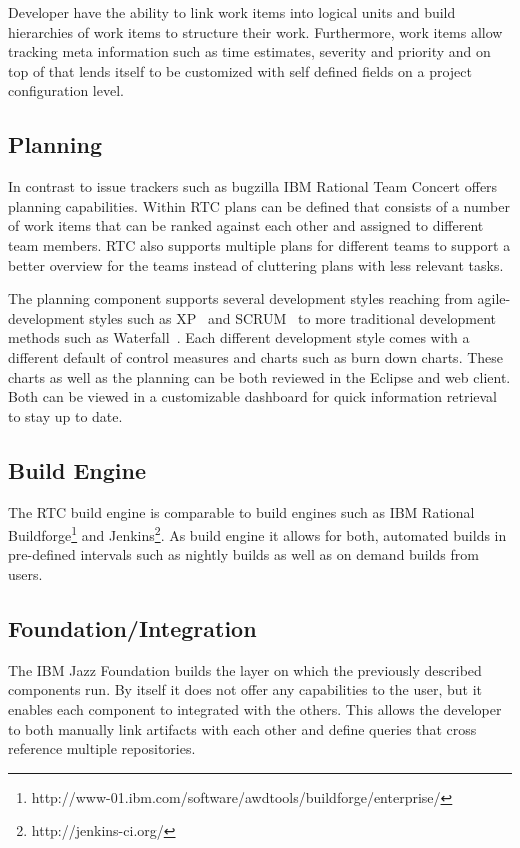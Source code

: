 Developer have the ability to link work items into logical units and build hierarchies of work items to structure their work.
Furthermore, work items allow tracking meta information such as time estimates, severity and priority and on top of that lends itself to be customized with self defined fields on a project configuration level.


\subsection{Planning}
In contrast to issue trackers such as bugzilla IBM Rational Team Concert offers planning capabilities.
Within RTC plans can be defined that consists of a number of work items that can be ranked against each other and assigned to different team members.
RTC also supports multiple plans for different teams to support a better overview for the teams instead of cluttering plans with less relevant tasks.

The planning component supports several development styles reaching from agile-development styles such as XP~\cite{} and SCRUM~\cite{} to more traditional development methods such as Waterfall~\cite{}.
Each different development style comes with a different default of control measures and charts such as burn down charts.
These charts as well as the planning can be both reviewed in the Eclipse and web client.
Both can be viewed in a customizable dashboard for quick information retrieval to stay up to date.

\subsection{Build Engine}
The RTC build engine is comparable to build engines such as IBM Rational Buildforge\footnote{http://www-01.ibm.com/software/awdtools/buildforge/enterprise/} and Jenkins\footnote{http://jenkins-ci.org/}.
As build engine it allows for both, automated builds in pre-defined intervals such as nightly builds as well as on demand builds from users.

\subsection{Foundation/Integration}
The IBM Jazz Foundation builds the layer on which the previously described components run.
By itself it does not offer any capabilities to the user, but it enables each component to integrated with the others. 
This allows the developer to both manually link artifacts with each other and define queries that cross reference multiple repositories.

